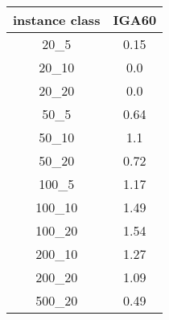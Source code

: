 \begin{tabular}{c|c|}
instance class & IGA60 \\ 
\hline
20_5         & 0.15         \\ 
20_10        & 0.0          \\ 
20_20        & 0.0          \\ 
50_5         & 0.64         \\ 
50_10        & 1.1          \\ 
50_20        & 0.72         \\ 
100_5        & 1.17         \\ 
100_10       & 1.49         \\ 
100_20       & 1.54         \\ 
200_10       & 1.27         \\ 
200_20       & 1.09         \\ 
500_20       & 0.49         \\ 
\end{tabular}